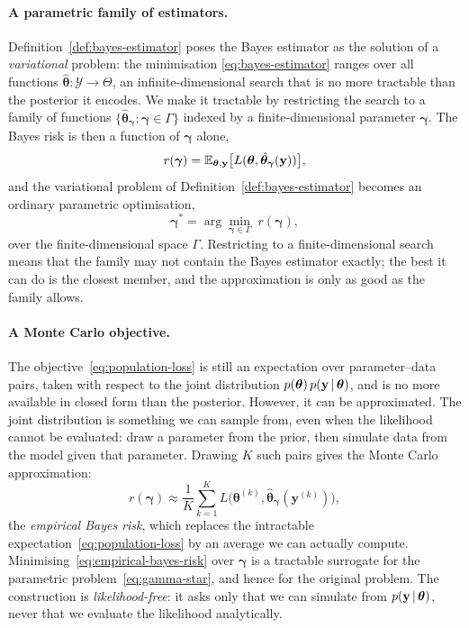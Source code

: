 \paragraph{A parametric family of estimators.}
Definition~\ref{def:bayes-estimator} poses the Bayes estimator as the
solution of a \emph{variational} problem: the minimisation
\eqref{eq:bayes-estimator} ranges over all functions
$\hat{\bm{\theta}} : \mathcal{Y} \to \Theta$, an
infinite-dimensional search that is no more tractable than the
posterior it encodes. We make it tractable by restricting the search
to a family of functions
$\{\hat{\bm{\theta}}_{\bm{\gamma}} : \bm{\gamma} \in \Gamma\}$ indexed
by a finite-dimensional parameter $\bm{\gamma}$. The Bayes risk is then
a function of $\bm{\gamma}$ alone,
%
\begin{equation}
  r(\bm{\gamma})
  = \mathbb{E}_{\bm{\theta}, \mathbf{y}}
    \big[L(\bm{\theta},
    \hat{\bm{\theta}}_{\bm{\gamma}}(\mathbf{y}))\big],
  \label{eq:population-loss}
\end{equation}
%
and the variational problem of Definition~\ref{def:bayes-estimator}
becomes an ordinary parametric optimisation,
%
\begin{equation}
  \bm{\gamma}^{*}
  = \arg\min_{\bm{\gamma} \in \Gamma}\; r(\bm{\gamma}),
  \label{eq:gamma-star}
\end{equation}
%
over the finite-dimensional space $\Gamma$. Restricting to a finite-dimensional search means that the family may not contain the Bayes estimator exactly; the best it can do
is the closest member, and the approximation is only as good as the
family allows.

\paragraph{A Monte Carlo objective.}
The objective~\eqref{eq:population-loss} is still an expectation over
parameter--data pairs, taken with respect to the joint distribution
$p(\bm{\theta})\,p(\mathbf{y} \,|\, \bm{\theta})$, and is no more
available in closed form than the posterior. However, it can be
approximated. The joint distribution is something we can sample
from, even when the likelihood cannot be evaluated: draw a parameter
from the prior, then simulate data from the model given that
parameter. Drawing $K$ such pairs gives the Monte Carlo approximation:
%
\begin{equation}
  r(\bm{\gamma})
  \approx \frac{1}{K}\sum_{k=1}^{K}
  L\big(\bm{\theta}^{(k)},
  \hat{\bm{\theta}}_{\bm{\gamma}}(\mathbf{y}^{(k)})\big),
  \label{eq:empirical-bayes-risk}
\end{equation}
%
the \emph{empirical Bayes risk}, which replaces the intractable
expectation~\eqref{eq:population-loss} by an average we can actually
compute. Minimising~\eqref{eq:empirical-bayes-risk} over $\bm{\gamma}$
is a tractable surrogate for the parametric
problem~\eqref{eq:gamma-star}, and hence for the original problem. The construction is \emph{likelihood-free}: it asks only that
we can simulate from $p(\mathbf{y} \,|\, \bm{\theta})$, never that we
evaluate the likelihood analytically.

